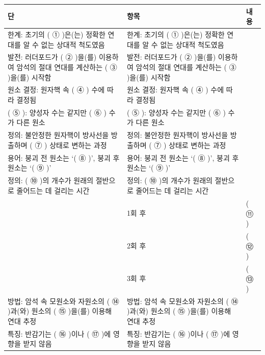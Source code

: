 \documentclass[fs9,seriesRus]{korfarm-base}
\begin{document}
\kfActivityBg \par{}\par\nopagebreak[4]\smallskip\nopagebreak[4]
\par\medskip{}
\begin{tcolorbox}[enhanced, breakable=true,
  colback=kfPaper, colframe=kfRule, boxrule=0.4pt, arc=2pt,
  left=8pt, right=8pt, top=6pt, bottom=6pt,
  title={\footnotesize\bfseries\color{kfMute} 글의 구조도},
  coltitle=kfMute, colbacktitle=kfPrimaryLight!40,
  attach boxed title to top left={yshift=-1.5mm, xshift=6pt},
  boxed title style={colframe=kfRule, boxrule=0.3pt, arc=1pt}]
\footnotesize{}
\renewcommand{\arraystretch}{1.35}
\noindent\begin{tabularx}{\linewidth}{|>{\centering\arraybackslash}p{1.6cm}|>{\raggedright\arraybackslash}p{3.4cm}|>{\raggedright\arraybackslash}X|}
\hline
\rowcolor{kfPrimaryLight!40}\textbf{\color{kfPrimary}단} & \textbf{\color{kfPrimary}항목} & \textbf{\color{kfPrimary}내용} \\\hline
한계: 초기의 ( ① )은(는) 정확한 연대를 알 수 없는 상대적 척도였음 & 한계: 초기의 ( ① )은(는) 정확한 연대를 알 수 없는 상대적 척도였음 &  \\\hline
발전: 러더포드가 ( ② )을(를) 이용하여 암석의 절대 연대를 계산하는 ( ③ )을(를) 시작함 & 발전: 러더포드가 ( ② )을(를) 이용하여 암석의 절대 연대를 계산하는 ( ③ )을(를) 시작함 &  \\\hline
원소 결정: 원자핵 속 ( ④ ) 수에 따라 결정됨 & 원소 결정: 원자핵 속 ( ④ ) 수에 따라 결정됨 &  \\\hline
( ⑤ ): 양성자 수는 같지만 ( ⑥ ) 수가 다른 원소 & ( ⑤ ): 양성자 수는 같지만 ( ⑥ ) 수가 다른 원소 &  \\\hline
정의: 불안정한 원자핵이 방사선을 방출하며 ( ⑦ ) 상태로 변하는 과정 & 정의: 불안정한 원자핵이 방사선을 방출하며 ( ⑦ ) 상태로 변하는 과정 &  \\\hline
용어: 붕괴 전 원소는 ‘( ⑧ )’, 붕괴 후 원소는 ‘( ⑨ )’ & 용어: 붕괴 전 원소는 ‘( ⑧ )’, 붕괴 후 원소는 ‘( ⑨ )’ &  \\\hline
정의: ( ⑩ )의 개수가 원래의 절반으로 줄어드는 데 걸리는 시간 & 정의: ( ⑩ )의 개수가 원래의 절반으로 줄어드는 데 걸리는 시간 &  \\\hline
\multirow{3}{*}{비율 변화 (모원소:자원소):} & 1회 후 & ( ⑪ ) \\\cline{2-3}
 & 2회 후 & ( ⑫ ) \\\cline{2-3}
 & 3회 후 & ( ⑬ ) \\\cline{2-3}
\hline
방법: 암석 속 모원소와 자원소의 ( ⑭ )과(와) 원소의 ( ⑮ )을(를) 이용해 연대 추정 & 방법: 암석 속 모원소와 자원소의 ( ⑭ )과(와) 원소의 ( ⑮ )을(를) 이용해 연대 추정 &  \\\hline
특징: 반감기는 ( ⑯ )이나 ( ⑰ )에 영향을 받지 않음 & 특징: 반감기는 ( ⑯ )이나 ( ⑰ )에 영향을 받지 않음 &  \\\hline
\end{tabularx}
\end{tcolorbox}\par\medskip
{}
\end{document}
